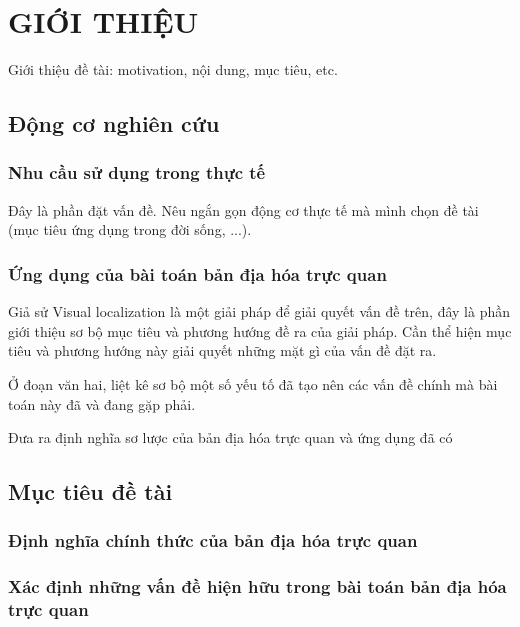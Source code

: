 \chapter{GIỚI THIỆU}

Giới thiệu đề tài: motivation, nội dung, mục tiêu, etc.

\section{Động cơ nghiên cứu}

\subsection*{Nhu cầu sử dụng trong thực tế}

Đây là phần đặt vấn đề. Nêu ngắn gọn động cơ thực tế mà mình chọn đề tài (mục tiêu ứng dụng trong đời sống, ...).

\subsection*{Ứng dụng của bài toán bản địa hóa trực quan}

Giả sử Visual localization là một giải pháp để giải quyết vấn đề trên, đây là phần giới thiệu sơ bộ mục tiêu và phương hướng đề ra của giải pháp. Cần thể hiện mục tiêu và phương hướng này giải quyết những mặt gì của vấn đề đặt ra.

Ở đoạn văn hai, liệt kê sơ bộ một số yếu tố đã tạo nên các vấn đề chính mà bài toán này đã và đang gặp phải.

Đưa ra định nghĩa sơ lược của bản địa hóa trực quan và ứng dụng đã có

\section{Mục tiêu đề tài}
\subsection*{Định nghĩa chính thức của bản địa hóa trực quan}

\subsection*{Xác định những vấn đề hiện hữu trong bài toán bản địa hóa trực quan}

